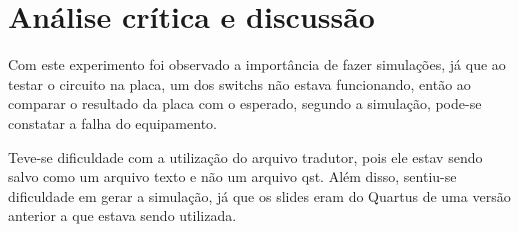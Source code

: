 \chapter{Análise crítica e discussão}
Com este experimento foi observado a importância de fazer simulações, já que ao testar o circuito na placa,
um dos switchs não estava funcionando, então ao comparar o resultado da placa com o esperado,
 segundo a simulação, pode-se constatar a falha do equipamento.

 Teve-se dificuldade com a utilização do arquivo tradutor, pois ele estav sendo salvo como um arquivo texto
 e não um arquivo qst. Além disso, sentiu-se dificuldade em gerar a simulação, já que os slides eram do Quartus
 de uma versão anterior a que estava sendo utilizada.

